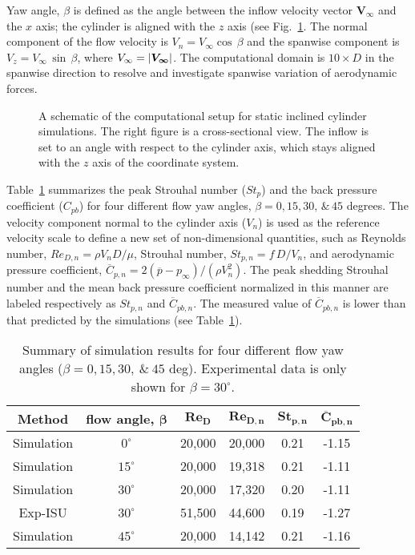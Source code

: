 Yaw angle, $\beta$ is defined as the angle between the inflow velocity vector
$\boldsymbol{V_\infty}$ and the $x$ axis; the cylinder is aligned with the $z$
axis (see Fig.~\ref{fig:yawedModel}. The normal component of the flow velocity
is $V_n=V_\infty \cos\,\beta$ and the spanwise component is $V_z = V_\infty
\,\sin\,\beta$, where $V_\infty=\left| \boldsymbol{V_\infty} \right|$.  The
computational domain is $10\times D$ in the spanwise direction to resolve and
investigate spanwise variation of aerodynamic forces.
%
\begin{figure}[htb!]
  \caption{A schematic of the computational setup for static inclined cylinder
    simulations. The right figure is a cross-sectional view.  The inflow is set
    to an angle with respect to the cylinder axis, which stays aligned with the $z$
    axis of the coordinate system.}
  \label{fig:yawedModel}
\end{figure}

Table~\ref{tab:comparisonYawedRe20k} summarizes the peak Strouhal number
($St_p$) and the back pressure coefficient ($C_{pb}$) for four different flow
yaw angles, $\beta=0,15,30,\,\&\,45$ degrees. The velocity component normal to
the cylinder axis ($V_n$) is used as the reference velocity scale to define a
new set of non-dimensional quantities, such as Reynolds number, $Re_{D,n} =
\rho V_n D / \mu$, Strouhal number, $St_{p,n}=f\,D /V_n$, and aerodynamic
pressure coefficient, $\overline{C}_{p,n}=2 (\overline{p}-p_\infty)/(\rho
V_n^2)$. The peak shedding Strouhal number and the mean back pressure
coefficient normalized in this manner are labeled respectively as $St_{p,n}$
and $\overline{C}_{pb,n}$. The measured value of $\overline{C}_{pb,n}$ is lower
than that predicted by the simulations (see
Table~\ref{tab:comparisonYawedRe20k}).
%
\begin{table}[htb!]
  \caption{Summary of simulation results for four different flow yaw angles
  ($\beta=0, 15, 30,~\&~45$ deg). Experimental data is only shown for
  $\beta=30^\circ$.} 
  \label{tab:comparisonYawedRe20k} 
  \begin{center}
  \begin{tabular}{c|c|c|c|c|c}
      \textbf{Method} & \textbf{flow angle,} $\boldsymbol{\beta}$ & $\boldsymbol{Re_D}$ & $\boldsymbol{Re_{D,n}}$  & $\boldsymbol{St_{p,n}}$ & $\boldsymbol{\overline{C}_{pb,n}}$  \\ \hline
      \hline
      Simulation  & $0^\circ$  & 20,000 & 20,000 & 0.21 & -1.15 \\ \hline
      Simulation  & $15^\circ$ & 20,000 & 19,318 & 0.21 & -1.11 \\ \hline
      Simulation  & $30^\circ$ & 20,000 & 17,320 & 0.20 & -1.11  \\ \hline
      \rowcolor[gray]{.9}
      Exp-ISU     & $30^\circ$ & 51,500 & 44,600 & 0.19 & -1.27  \\ \hline
      Simulation  & $45^\circ$ & 20,000 & 14,142 & 0.21 & -1.16  \\ \hline
      \hline
  \end{tabular}
  \end{center}
\end{table}

